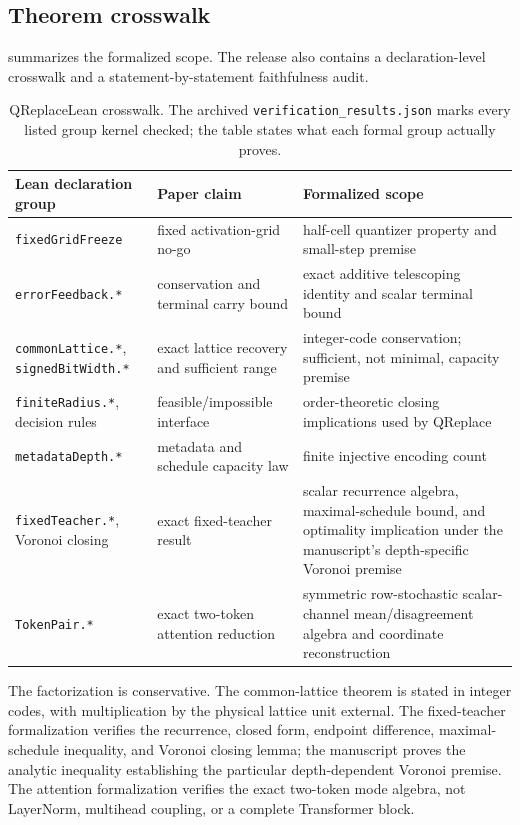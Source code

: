 \documentclass[twoside,11pt]{article}
\begin{document}
\subsection{Theorem crosswalk}
\label{app:lean-crosswalk}

 summarizes the formalized scope.  The release also
contains a declaration-level crosswalk and a statement-by-statement
faithfulness audit.

\begin{table}[ht]
\centering
\caption{QReplaceLean crosswalk.  The archived
\texttt{verification\_results.json} marks every listed group kernel checked;
the table states what each formal group actually proves.}
\label{tab:lean-crosswalk}
\footnotesize
\begin{tabularx}{\linewidth}{@{}Y{.25\linewidth}Y{.30\linewidth}X@{}}
\toprule
Lean declaration group & Paper claim & Formalized scope\\
\midrule
\texttt{fixedGridFreeze} & fixed activation-grid no-go & half-cell quantizer
property and small-step premise\\
\texttt{errorFeedback.*} & conservation and terminal carry bound & exact
additive telescoping identity and scalar terminal bound\\
\texttt{commonLattice.*}, \texttt{signedBitWidth.*} & exact lattice recovery
and sufficient range & integer-code conservation; sufficient, not minimal,
capacity premise\\
\texttt{finiteRadius.*}, decision rules & feasible/impossible interface &
order-theoretic closing implications used by QReplace\\
\texttt{metadataDepth.*} & metadata and schedule capacity law & finite
injective encoding count\\
\texttt{fixedTeacher.*}, Voronoi closing & exact fixed-teacher result & scalar
recurrence algebra, maximal-schedule bound, and optimality implication under
the manuscript's depth-specific Voronoi premise\\
\texttt{TokenPair.*} & exact two-token attention reduction & symmetric
row-stochastic scalar-channel mean/disagreement algebra and coordinate
reconstruction\\
\bottomrule
\end{tabularx}
\end{table}

The factorization is conservative.  The common-lattice theorem
is stated in integer codes, with multiplication by the physical lattice unit
external.  The fixed-teacher formalization verifies the recurrence, closed
form, endpoint difference, maximal-schedule inequality, and Voronoi closing
lemma; the manuscript proves the analytic inequality establishing the
particular depth-dependent Voronoi premise.  The attention formalization
verifies the exact two-token mode algebra, not LayerNorm, multihead coupling,
or a complete Transformer block.
\end{document}
